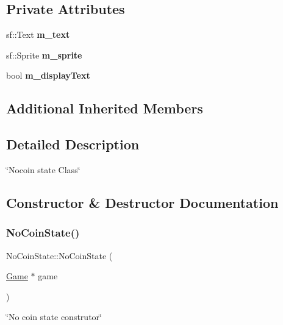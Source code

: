 \subsection*{Private Attributes}
\begin{DoxyCompactItemize}
\item 
\mbox{\label{classNoCoinState_aa29e5ec2201fb33b38cc6511101def24}} 
sf\+::\+Text {\bfseries m\+\_\+text}
\item 
\mbox{\label{classNoCoinState_aafd7220e481cf89461d42b956975bed4}} 
sf\+::\+Sprite {\bfseries m\+\_\+sprite}
\item 
\mbox{\label{classNoCoinState_a01373bc21949f3797e36bdabfb1c32f5}} 
bool {\bfseries m\+\_\+display\+Text}
\end{DoxyCompactItemize}
\subsection*{Additional Inherited Members}


\subsection{Detailed Description}
\char`\"{}\+Nocoin state Class\char`\"{} 

\subsection{Constructor \& Destructor Documentation}
\mbox{\label{classNoCoinState_ab06a3e84e2a20c14e036e68e9e6eb667}} 
\subsubsection{\texorpdfstring{No\+Coin\+State()}{NoCoinState()}}
{\footnotesize\ttfamily No\+Coin\+State\+::\+No\+Coin\+State (\begin{DoxyParamCaption}\item[{\hyperlink{classGame}{Game} $\ast$}]{game }\end{DoxyParamCaption})}



\char`\"{}\+No coin state construtor\char`\"{} 

